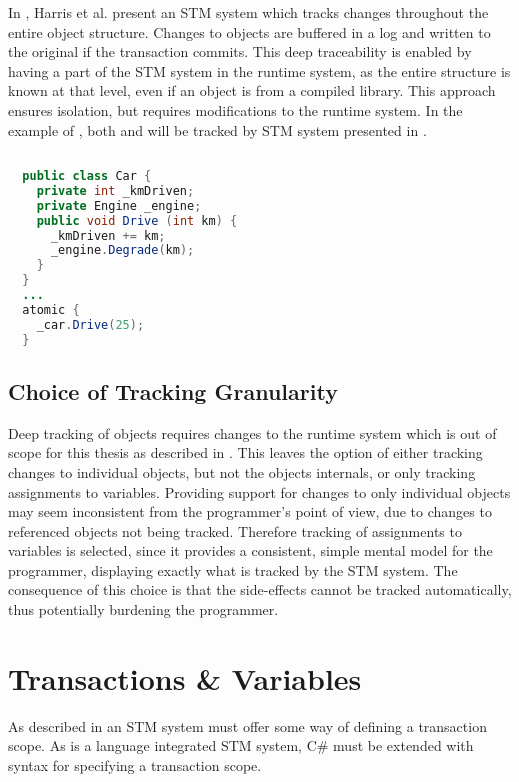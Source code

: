 In \cite{harris2003language}, Harris et al. present an \ac{STM} system which tracks changes throughout the entire object structure. Changes to objects are buffered in a log and written to the original if the transaction commits. This deep traceability is enabled by having a part of the \ac{STM} system in the runtime system, as the entire structure is known at that level, even if an object is from a compiled library. This approach ensures isolation, but requires modifications to the runtime system. In the example of , both  and  will be tracked by \ac{STM} system presented in \cite{harris2003language}.
%
\begin{lstlisting}[label=lst:tracking_object,
 float,
 caption={Tracking Changes to Object},
 language=Java, 
 showspaces=false,
 showtabs=false,
 breaklines=true,
 showstringspaces=false,
 breakatwhitespace=true,
 commentstyle=\color{greencomments},
 keywordstyle=\color{bluekeywords},
 stringstyle=\color{redstrings},
 morekeywords={atomic, retry, orElse, var, get, set}]  % Start your code-block
  
  public class Car {
    private int _kmDriven;
    private Engine _engine;
    public void Drive (int km) {
      _kmDriven += km;
      _engine.Degrade(km);
    }
  }
  ...
  atomic {
    _car.Drive(25);
  }
\end{lstlisting}
%
\subsection{Choice of Tracking Granularity}
Deep tracking of objects requires changes to the runtime system which is out of scope for this thesis as described in . This leaves the option of either tracking changes to individual objects, but not the objects internals, or only tracking assignments to variables. Providing support for changes to only individual objects may seem inconsistent from the programmer’s point of view, due to changes to referenced objects not being tracked. Therefore tracking of assignments to variables is selected, since it provides a consistent, simple mental model for the programmer, displaying exactly what is tracked by the \ac{STM} system. The consequence of this choice is that the side-effects cannot be tracked automatically, thus potentially burdening the programmer.

\section{Transactions \& Variables}
\label{subsec:rec_transactions_variables}
As described in  an \ac{STM} system must offer some way of defining a transaction scope. As \stmnamesp is a language integrated \ac{STM} system, C\# must be extended with syntax for specifying a transaction scope.

